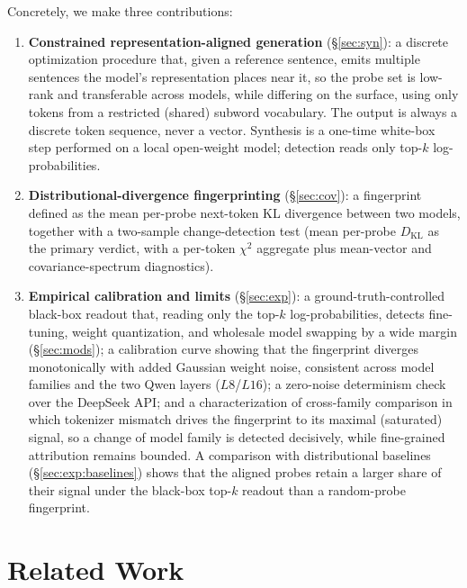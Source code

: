 \documentclass[11pt]{article}
\theoremstyle{definition}
\begin{document}
Concretely, we make three contributions:

\begin{enumerate}
  \item \textbf{Constrained representation-aligned generation}
  (\S\ref{sec:syn}): a discrete optimization procedure that, given a
  reference sentence, emits multiple sentences the model's representation places
  near it, so the probe set is low-rank and transferable across models, while
  differing on the surface, using only tokens
  from a restricted (shared) subword vocabulary. The output is always a discrete
  token sequence, never a vector. Synthesis is a one-time white-box step
  performed on a local open-weight model; detection reads only top-$k$
  log-probabilities.

  \item \textbf{Distributional-divergence fingerprinting}
  (\S\ref{sec:cov}): a fingerprint defined as the mean per-probe next-token KL
  divergence between two models, together with a two-sample change-detection
  test (mean per-probe $D_{\mathrm{KL}}$ as the primary verdict, with a
  per-token $\chi^2$ aggregate plus mean-vector and covariance-spectrum
  diagnostics).

  \item \textbf{Empirical calibration and limits} (\S\ref{sec:exp}): a
  ground-truth-controlled black-box readout that, reading only the top-$k$
  log-probabilities, detects fine-tuning, weight quantization, and wholesale
  model swapping by a wide margin (\S\ref{sec:mods}); a calibration curve
  showing that the fingerprint diverges monotonically with added Gaussian
  weight noise, consistent across model families and the two Qwen layers
  ($L8$/$L16$); a zero-noise determinism check over the DeepSeek
  API; and a characterization of cross-family comparison in which tokenizer
  mismatch drives the fingerprint to its maximal (saturated) signal, so a
  change of model family is detected decisively, while fine-grained
  attribution remains bounded. A comparison with distributional baselines
  (\S\ref{sec:exp:baselines}) shows that the aligned probes retain a larger
  share of their signal under the black-box top-$k$ readout than a
  random-probe fingerprint.
\end{enumerate}

\section{Related Work}
\label{sec:related}
\end{document}
